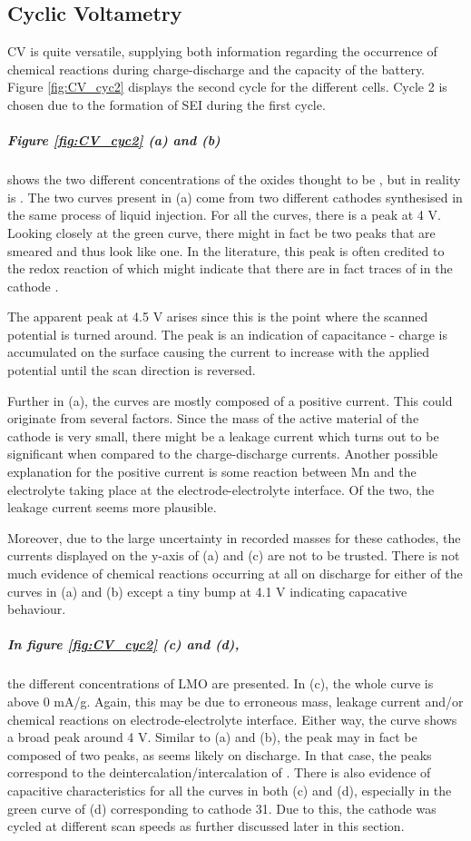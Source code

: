 \documentclass[Main/main.tex]{subfiles}
\begin{document}
\FloatBarrier
\subsection{Cyclic Voltametry}
CV is quite versatile, supplying both information regarding the occurrence of chemical reactions during charge-discharge and the capacity of the battery.
Figure \ref{fig:CV_cyc2} displays the second cycle for the different cells. Cycle 2 is chosen due to the formation of SEI during the first cycle.

\subparagraph{Figure \ref{fig:CV_cyc2} (a) and (b)} \hspace{-1em} shows the two different concentrations of the oxides thought to be , but in reality is . The two curves present in (a) come from two different cathodes synthesised in the same process of liquid injection. For all the curves, there is a peak at 4 V. Looking closely at the green curve, there might in fact be two peaks that are smeared and thus look like one. In the literature, this peak is often credited to the redox reaction of  which might indicate that there are in fact traces of  in the cathode \cite{LNMO}.

The apparent peak at 4.5 V arises since this is the point where the scanned potential is turned around. The peak is an indication of capacitance - charge is accumulated on the surface causing the current to increase with the applied potential until the scan direction is reversed. 

Further in (a), the curves are mostly composed of a positive current. This could originate from several factors. Since the mass of the active material of the cathode is very small, there might be a leakage current which turns out to be significant when compared to the charge-discharge currents. Another possible explanation for the positive current is some reaction between Mn and the electrolyte taking place at the electrode-electrolyte interface. Of the two, the leakage current seems more plausible.

Moreover, due to the large uncertainty in recorded masses for these cathodes, the currents displayed on the y-axis of (a) and (c) are not to be trusted.
There is not much evidence of chemical reactions occurring at all on discharge for either of the curves in (a) and (b) except a tiny bump at 4.1 V indicating capacative behaviour.

\subparagraph{In figure \ref{fig:CV_cyc2} (c) and (d),} \hspace{-1em} the different concentrations of LMO are presented. In (c), the whole curve is above 0 mA/g. Again, this may be due to erroneous mass, leakage current and/or chemical reactions on electrode-electrolyte interface. Either way, the curve shows a broad peak around 4 V. Similar to (a) and (b), the peak may in fact be composed of two peaks, as seems likely on discharge. In that case, the peaks correspond to the deintercalation/intercalation of  \cite{nano_LMO}. There is also evidence of capacitive characteristics for all the curves in both (c) and (d), especially in the green curve of (d) corresponding to cathode 31. Due to this, the cathode was cycled at different scan speeds as further discussed later in this section.
\end{document}
